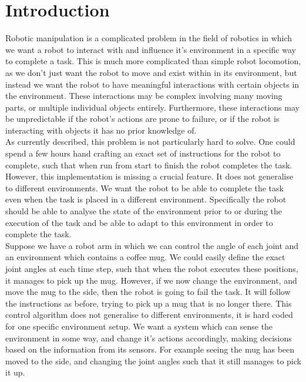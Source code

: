 \chapter{Introduction}
\label{chap:introduction}

Robotic manipulation is a complicated problem in the field of robotics in which we want a robot to interact with and influence it's environment in a specific way to complete a task. This is much more complicated than simple robot locomotion, as we don't just want the robot to move and exist within in its environment, but instead we want the robot to have meaningful interactions with certain objects in the environment. These interactions may be complex involving many moving parts, or multiple individual objects entirely. Furthermore, these interactions may be unpredictable if the robot's actions are prone to failure, or if the robot is interacting with objects it has no prior knowledge of.\\

As currently described, this problem is not particularly hard to solve. One could spend a few hours hand crafting an exact set of instructions for the robot to complete, such that when run from start to finish the robot completes the task. However, this implementation is missing a crucial feature. It does not generalise to different environments. We want the robot to be able to complete the task even when the task is placed in a different environment. Specifically the robot should be able to analyse the state of the environment prior to or during the execution of the task and be able to adapt to this environment in order to complete the task.\\

Suppose we have a robot arm in which we can control the angle of each joint and an environment which contains a coffee mug. We could easily define the exact joint angles at each time step, such that when the robot executes these positions, it manages to pick up the mug. However, if we now change the environment, and move the mug to the side, then the robot is going to fail the task. It will follow the instructions as before, trying to pick up a mug that is no longer there. This control algorithm does not generalise to different environments, it is hard coded for one specific environment setup. We want a system which can sense the environment in some way, and change it's actions accordingly, making decisions based on the information from its sensors. For example seeing the mug has been moved to the side, and changing the joint angles such that it still manages to pick it up.\\

